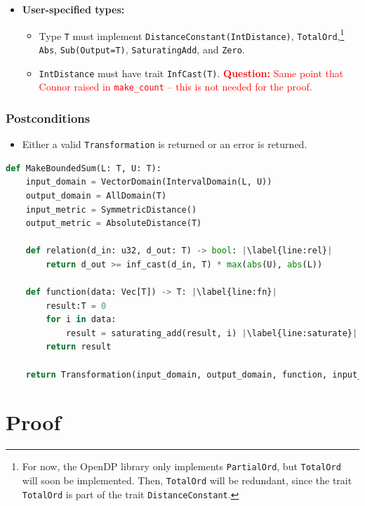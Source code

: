 \documentclass[11pt,a4paper]{article}
\theoremstyle{definition}
\newcommand{\questionc}[1]{\textcolor{red}{\textbf{Question:} #1}}
\begin{document}
\begin{itemize}
    \item \textbf{User-specified types:}
    \begin{itemize}
        \item Type \texttt{T} must implement \texttt{DistanceConstant(IntDistance)}, \texttt{TotalOrd},\footnote{For now, the OpenDP library only implements \texttt{PartialOrd}, but \texttt{TotalOrd} will soon be implemented. Then, \texttt{TotalOrd} will be redundant, since the trait \texttt{TotalOrd} is part of the trait \texttt{DistanceConstant}.} \texttt{Abs}, \texttt{Sub(Output=T)}, \texttt{SaturatingAdd}, and \texttt{Zero}.
        \item \texttt{IntDistance} must have trait \texttt{InfCast(T)}. \questionc{Same point that Connor raised in \texttt{make\_count} -- this is not needed for the proof.}
\end{itemize}
\end{itemize}

\subsubsection*{Postconditions}
\begin{itemize}
    \item Either a valid \texttt{Transformation} is returned or an error is returned.
\end{itemize}

\begin{lstlisting}[language=Python, escapechar=|]
def MakeBoundedSum(L: T, U: T):
    input_domain = VectorDomain(IntervalDomain(L, U))
    output_domain = AllDomain(T)
    input_metric = SymmetricDistance()
    output_metric = AbsoluteDistance(T)
    
    def relation(d_in: u32, d_out: T) -> bool: |\label{line:rel}|
        return d_out >= inf_cast(d_in, T) * max(abs(U), abs(L))
    
    def function(data: Vec[T]) -> T: |\label{line:fn}|
        result:T = 0
        for i in data:
            result = saturating_add(result, i) |\label{line:saturate}|
        return result
        
    return Transformation(input_domain, output_domain, function, input_metric, output_metric, stability_relation = relation)
\end{lstlisting}

\section{Proof}
\end{document}
